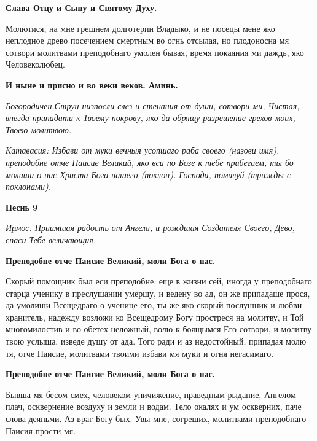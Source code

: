 \bfseries Слава Отцу и Сыну и Святому Духу\normalfont{}. 




Молютися, на мне грешнем долготерпи Владыко, и не посецы мене яко неплодное древо посечением смертным во огнь отсылая, но плодоносна мя сотвори молитвами преподобнаго умолен бывая, время покаяния ми даждь, яко Человеколюбец. 




\bfseries И ныне и присно и во веки веков. Аминь\normalfont{}. 




\itshape Богородичен.\normalfont{}Струи низпосли слез и стенания от души, сотвори ми, Чистая, внегда припадати к Твоему покрову, яко да обрящу разрешение грехов моих, Твоею молитвою.




\itshape Катавасия:\normalfont{} Избави от муки вечныя усопшаго раба своего (\itshape назови имя\normalfont{}), преподобне отче Паисие Великий, яко вси по Бозе к тебе прибегаем, ты бо молиши о нас Христа Бога нашего (\itshape поклон\normalfont{}). Господи, помилуй (\itshape трижды с поклонами\normalfont{}). 




\bfseries Песнь 9 \normalfont{}




\itshape Ирмос\normalfont{}. Приимшая радость от Ангела, и рождшая Создателя Своего, Дево, спаси Тебе величающия. 




\bfseries Преподобне отче Паисие Великий, моли Бога о нас.\normalfont{}


Скорый помощник был еси преподобне, еще в жизни сей, иногда у преподобнаго старца ученику в преслушании умершу, и ведену во ад, он же припадаше прося, да умолиши Всещедраго о ученице его, ты же яко скорый послушник и любви хранитель, надежду возложи ко Всещедрому Богу простреся на молитву, и Той многомилостив и во обетех неложный, волю к боящымся Его сотвори, и молитву твою услыша, изведе душу от ада. Того ради и аз недостойный, припадая молю тя, отче Паисие, молитвами твоими избави мя муки и огня негасимаго. 




\bfseries Преподобне отче Паисие Великий, моли Бога о нас.\normalfont{}


Бывша мя бесом смех, человеком уничижение, праведным рыдание, Ангелом плач, осквернение воздуху и земли и водам. Тело окалях и ум оскверних, паче слова деяньми. Аз враг Богу бых. Увы мне, согреших, молитвами преподобнаго Паисия прости мя. 




